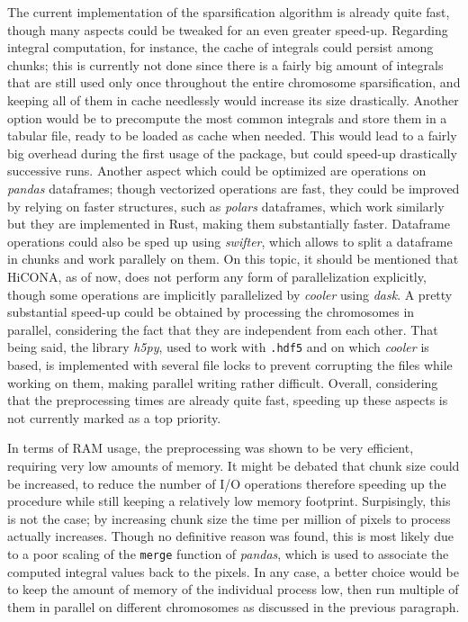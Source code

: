 The current implementation of the sparsification algorithm is already quite fast, though many aspects could be tweaked for an even greater speed-up. Regarding integral computation, for instance, the cache of integrals could persist among chunks; this is currently not done since there is a fairly big amount of integrals that are still used only once throughout the entire chromosome sparsification, and keeping all of them in cache needlessly would increase its size drastically. Another option would be to precompute the most common integrals and store them in a tabular file, ready to be loaded as cache when needed. This would lead to a fairly big overhead during the first usage of the package, but could speed-up drastically successive runs. Another aspect which could be optimized are operations on \textit{pandas} dataframes; though vectorized operations are fast, they could be improved by relying on faster structures, such as \textit{polars} dataframes, which work similarly but they are implemented in Rust, making them substantially faster. Dataframe operations could also be sped up using \textit{swifter}, which allows to split a dataframe in chunks and work parallely on them. On this topic, it should be mentioned that HiCONA, as of now, does not perform any form of parallelization explicitly, though some operations are implicitly parallelized by \textit{cooler} using \textit{dask}. A pretty substantial speed-up could be obtained by processing the chromosomes in parallel, considering the fact that they are independent from each other. That being said, the library \textit{h5py}, used to work with \texttt{.hdf5} and on which \textit{cooler} is based, is implemented with several file locks to prevent corrupting the files while working on them, making parallel writing rather difficult. Overall, considering that the preprocessing times are already quite fast, speeding up these aspects is not currently marked as a top priority.

In terms of RAM usage, the preprocessing was shown to be very efficient, requiring very low amounts of memory. It might be debated that chunk size could be increased, to reduce the number of I/O operations therefore speeding up the procedure while still keeping a relatively low memory footprint. Surpisingly, this is not the case; by increasing chunk size the time per million of pixels to process actually increases. Though no definitive reason was found, this is most likely due to a poor scaling of the \texttt{merge} function of \textit{pandas}, which is used to associate the computed integral values back to the pixels. In any case, a better choice would be to keep the amount of memory of the individual process low, then run multiple of them in parallel on different chromosomes as discussed in the previous paragraph. 

